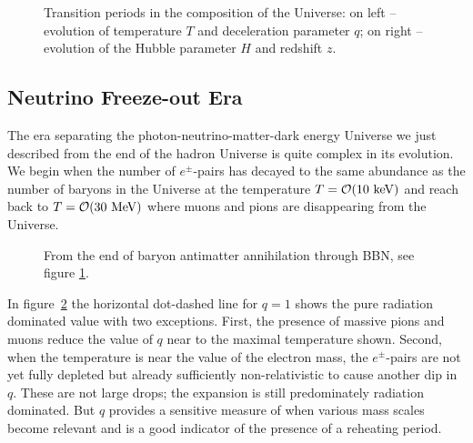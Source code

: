 \begin{figure}
\begin{minipage}{\linewidth}
\caption{Transition periods in the composition of the Universe: on left -- evolution of temperature $T$  and deceleration parameter $q$; on right --  evolution of the Hubble parameter $H$ and redshift $z$.
\label{fig:today} }
\end{minipage}
\end{figure}

\subsection{Neutrino Freeze-out Era }\label{nudecoup}
The era separating the photon-neutrino-matter-dark energy Universe we just described from the end of the hadron Universe is quite complex in its evolution.   We begin when the number of $e^\pm$-pairs has decayed to the same abundance as the number of baryons in the Universe at the temperature  $T=\mathcal{O}(10\text{ keV})$ and reach back to $T={\cal O}(30\MeV)$ where muons and pions are disappearing from the Universe.

\begin{figure}
\begin{minipage}{\linewidth}
\caption{From the end of baryon antimatter annihilation through BBN, see figure \ref{fig:today}.%
\label{fig:BBN}  }
\end{minipage}
\end{figure}

 In figure~\ref{fig:BBN} the horizontal dot-dashed line for $q=1$  shows the pure radiation dominated value with two exceptions. First, the presence of massive pions  and muons reduce  the value of $q$ near to the maximal temperature shown.  Second, when the temperature is near the value of the electron mass, the $e^\pm$-pairs are not yet fully depleted but already sufficiently non-relativistic to cause another dip in $q$.  These are not large drops; the expansion is still predominately radiation dominated.  But $q$ provides a sensitive measure of when various mass scales become relevant and is a good indicator of the presence of a reheating period.

